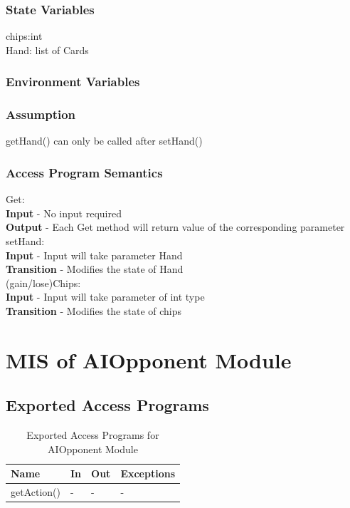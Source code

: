 \documentclass[11pt]{article}
\begin{document}
    \subsubsection{State Variables}
    chips:int\\
    Hand: list of Cards
    \subsubsection{Environment Variables}
    \subsubsection{Assumption}
    getHand() can only be called after setHand()
    \subsubsection{Access Program Semantics}
    Get:\\
    \textbf{Input} - No input required\\
    \textbf{Output} - Each Get method will return value of the corresponding parameter\\
    setHand:\\
   	\textbf{Input} - Input will take parameter Hand\\
   	\textbf{Transition} - Modifies the state of Hand\\
   	(gain/lose)Chips:\\
   	\textbf{Input} - Input will take parameter of int type\\
   	\textbf{Transition} - Modifies the state of chips
 	\newline
 	\section{MIS of AIOpponent Module}
     
    \subsection{Exported Access Programs}
    \begin{table}[h]
    \caption{Exported Access Programs for AIOpponent Module}
    \begin{tabular}{p{4cm}p{2cm}p{2cm}p{4cm}}
    Name & In & Out & Exceptions\\
    \hline
    getAction() & - & - & -\\
    \hline
    \end{tabular}
    \end{table}
\end{document}
